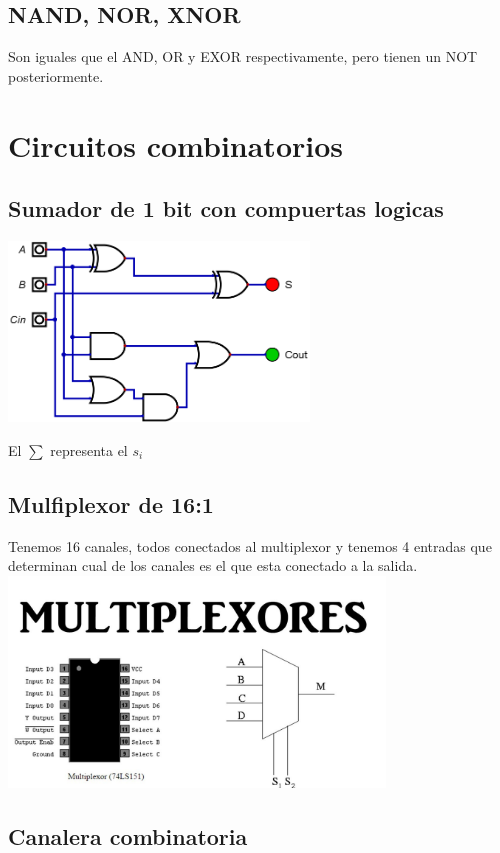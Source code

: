 \documentclass{report}
\begin{document}
\section{NAND, NOR, XNOR}

Son iguales que el AND, OR y EXOR respectivamente, pero tienen un NOT posteriormente.

\chapter{Circuitos combinatorios}

\section{Sumador de 1 bit con compuertas logicas}

\includegraphics[width=8cm]{../Assets/SumadorCompleto.png}

El $\sum$ representa el $s_i$

\section{Mulfiplexor de 16:1}
Tenemos 16 canales, todos conectados al multiplexor y tenemos 4 entradas que determinan
cual de los canales es el que esta conectado a la salida.
\includegraphics[width=10cm]{../Assets/multiplexor.jpg}

\section{Canalera combinatoria}
\end{document}
